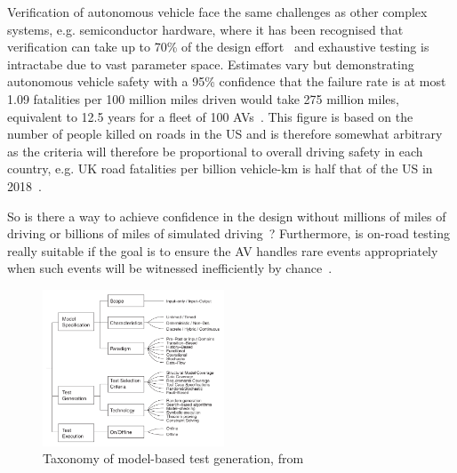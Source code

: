 \documentclass[letterpaper, 10 pt, journal, twoside]{IEEEtran}
\begin{document}
Verification of autonomous vehicle face the same challenges as other complex systems, e.g. semiconductor hardware, where it has been recognised that verification can take up to 70\% of the design effort~\cite{arden2002international} and exhaustive testing is intractabe due to vast parameter space.
%
Estimates vary but demonstrating autonomous vehicle safety with a 95\% confidence that the failure rate is at most 1.09 fatalities per 100 million miles driven would take 275 million miles, equivalent to 12.5 years for a fleet of 100 AVs~\cite{kalra2016driving}. %
%
This figure is based on the number of people killed on roads in the US and is therefore somewhat arbitrary as the criteria will therefore be proportional to overall driving safety in each country, e.g. UK road fatalities per billion vehicle-km is half that of the US in 2018~\cite{ITFroadSafety2018}.
%

So is there a way to achieve confidence in the design without millions of miles of driving or billions of miles of simulated driving~\cite{korosec2019waymo}? %
Furthermore, is on-road testing really suitable if the goal is to ensure the AV handles rare events appropriately when such events will be witnessed inefficiently by chance~\cite{Koopman2018}.
%
%


\begin{figure}[!t]
	\centering
\includegraphics[width=0.48\textwidth]{taxonomy.png}
	\caption{Taxonomy of model-based test generation, from \cite{utting2012taxonomy}}
	\label{taxonomy}
\end{figure}
\end{document}

